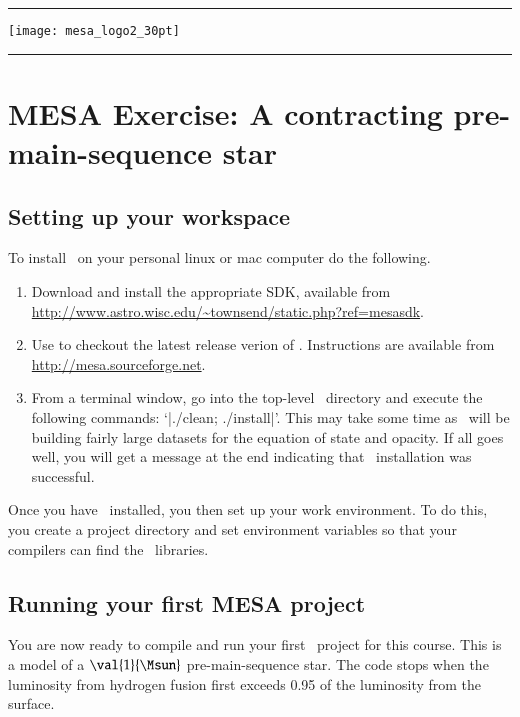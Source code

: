 
\DefineShortVerb{\|}

\newpage

\begin{center}
\rule[10pt]{60pt}{1pt}\texttt{[image: mesa\_logo2\_30pt]}\rule[10pt]{60pt}{1pt}
\end{center}

\section{MESA Exercise: A contracting pre-main-sequence star}\label{s.MESA-contraction}

\subsection{Setting up your workspace}

To install \mesa\ on your personal linux or mac computer do the following.
\begin{enumerate}
	\item Download and install the appropriate SDK, available from \url{http://www.astro.wisc.edu/~townsend/static.php?ref=mesasdk}. 
	\item Use  to checkout the latest release verion of \MESA. Instructions are available from \url{http://mesa.sourceforge.net}.
	\item From a terminal window, go into the top-level \mesa\ directory and execute the following commands: `|./clean; ./install|'.  This may take some time as \mesa\ will be building fairly large datasets for the equation of state and opacity.  If all goes well, you will get a message at the end indicating that \mesa\ installation was successful.
\end{enumerate}

Once you have \mesa\ installed, you then set up your work environment. To do this, you create a project directory and set environment variables so that your  compilers can find the \mesa\ libraries.

\subsection{Running your first MESA project}

You are now ready to compile and run your first \mesa\ project for this course. This is a model of a $\val{1}{\Msun}$ pre-main-sequence star. The code stops when the luminosity from hydrogen fusion first exceeds 0.95 of the luminosity from the surface. 

